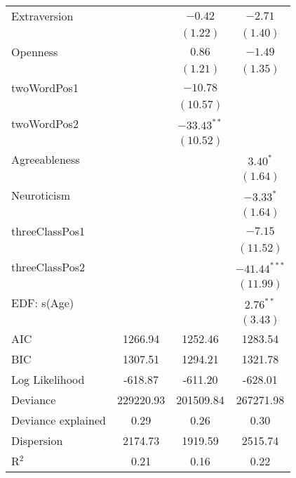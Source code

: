 {\begin{table}
\begin{center}
\begin{tabular}{l c c c }
	Extraversion          &                & $-0.42$       & $-2.71$        \\
	&                & $(1.22)$      & $(1.40)$       \\
	Openness              &                & $0.86$        & $-1.49$        \\
	&                & $(1.21)$      & $(1.35)$       \\
	twoWordPos1           &                & $-10.78$      &                \\
	&                & $(10.57)$     &                \\
	twoWordPos2           &                & $-33.43^{**}$ &                \\
	&                & $(10.52)$     &                \\
	Agreeableness         &                &               & $3.40^{*}$     \\
	&                &               & $(1.64)$       \\
	Neuroticism           &                &               & $-3.33^{*}$    \\
	&                &               & $(1.64)$       \\
	threeClassPos1        &                &               & $-7.15$        \\
	&                &               & $(11.52)$      \\
	threeClassPos2        &                &               & $-41.44^{***}$ \\
	&                &               & $(11.99)$      \\
	EDF: s(Age)           &                &               & $2.76^{**}$    \\
	&                &               & $(3.43)$       \\
	\hline
	AIC                   & 1266.94        & 1252.46       & 1283.54        \\
	BIC                   & 1307.51        & 1294.21       & 1321.78        \\
	Log Likelihood        & -618.87        & -611.20       & -628.01        \\
	Deviance              & 229220.93      & 201509.84     & 267271.98      \\
	Deviance explained    & 0.29           & 0.26          & 0.30           \\
	Dispersion            & 2174.73        & 1919.59       & 2515.74        \\
	R$^2$                 & 0.21           & 0.16          & 0.22           \\

\end{tabular}
\end{center}
\end{table}}
